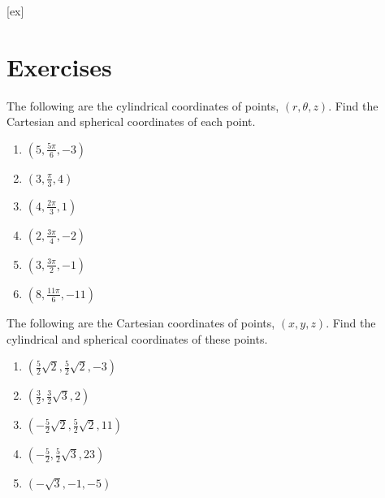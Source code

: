 [ex]
\section*{Exercises}

\begin{enumialphparenastyle}

\begin{ex} The following are the cylindrical coordinates of points, $\left(
r,\theta,z\right) $. Find the Cartesian and spherical coordinates of each point.

\begin{enumerate}
\item $\left( 5,\frac{5\pi }{6},-3\right) $

\item $\left( 3,\frac{\pi }{3},4\right) $

\item $\left( 4,\frac{2\pi }{3},1\right) $

\item $\left( 2,\frac{3\pi }{4},-2\right) $

\item $\left( 3,\frac{3\pi }{2},-1\right) $

\item $\left( 8,\frac{11\pi }{6},-11\right) $
\end{enumerate}
\end{ex}

\begin{ex} The following are the Cartesian coordinates of points, $\left(
x,y,z\right) $. Find the cylindrical and spherical coordinates of these
points.

\begin{enumerate}
\item $\left( \frac{5}{2}\sqrt{2},\frac{5}{2}\sqrt{2},-3\right) $

\item $\left( \frac{3}{2},\frac{3}{2}\sqrt{3},2\right) $

\item $\left( -\frac{5}{2}\sqrt{2},\frac{5}{2}\sqrt{2},11\right) $

\item $\left( -\frac{5}{2},\frac{5}{2}\sqrt{3},23\right) $

\item $\left( -\sqrt{3},-1,-5\right) $


\end{enumerate}
\end{ex}
\end{enumialphparenastyle}
